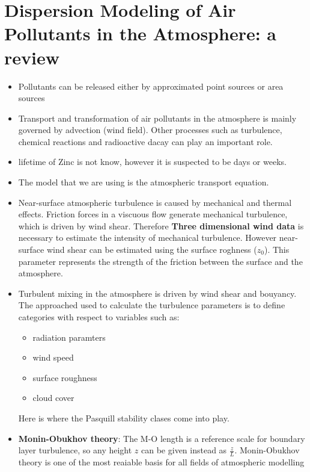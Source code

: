 \documentclass[12pt]{article}
\begin{document}
\section*{Dispersion Modeling of Air Pollutants in the Atmosphere: a review}
\begin{itemize}
\item Pollutants can be released either by approximated point sources or area sources
\item Transport and transformation of air pollutants in the atmosphere is mainly governed
by advection (wind field). Other processes such as turbulence, chemical reactions and
radioactive dacay can play an important role.
\item lifetime of Zinc is not know, however it is suspected to be days or weeks.
\item The model that we are using is the atmospheric transport equation.
\item Near-surface atmospheric turbulence is caused by mechanical and thermal effects.
Friction forces in a viscuous flow generate mechanical turbulence, which is driven by
wind shear. Therefore \textbf{Three dimensional wind data} is necessary to 
estimate the intensity of mechanical turbulence. However near-surface wind
shear can be estimated using the surface roghness ($z_{0}$). This
parameter represents the strength of the friction between the surface
and the atmosphere.
\item Turbulent mixing in the atmosphere is driven by wind shear and bouyancy.
The approached used to calculate the turbulence parameters is to define
categories with respect to variables such as:
	\begin{itemize}
	\item radiation paramters
	\item wind speed
	\item surface roughness
	\item cloud cover
	\end{itemize}
Here is where the Pasquill stability clases come into play.

\item \textbf{Monin-Obukhov theory}: The M-O length is a reference scale
for boundary layer turbulence, so any height $z$ can be
given instead as $\frac{z}{L}$. Monin-Obukhov theory
is one of the most reaiable basis for all fields of atmospheric modelling


\end{itemize}
\end{document}
